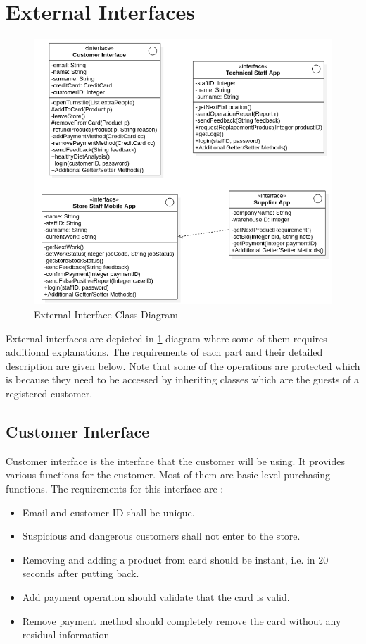 \section{External Interfaces}
\begin{figure}[h]
    \centering
    \includegraphics[width=0.9\linewidth]{content/specificRequirements/img/external_interfaces.PNG}
    \caption{External Interface Class Diagram}
    \label{fig:external_interface_class_diagram}
\end{figure}

External interfaces are depicted in \ref{fig:external_interface_class_diagram} diagram where some of them requires additional explanations. The requirements of each part and their detailed description are given below. Note that some of the operations are protected which is because they need to be accessed by inheriting classes which are the guests of a registered customer.

\subsection{Customer Interface}
Customer interface is the interface that the customer will be using. It provides various functions for the customer. Most of them are basic level purchasing functions. The requirements for this interface are :


\begin{itemize}
    \item Email and customer ID shall be unique.
    \item Suspicious and dangerous customers shall not enter to the store.
    \item Removing and adding a product from card should be instant, i.e. in 20 seconds after putting back.
    \item Add payment operation should validate that the card is valid.
    \item Remove payment method should completely remove the card without any residual information
\end{itemize}


